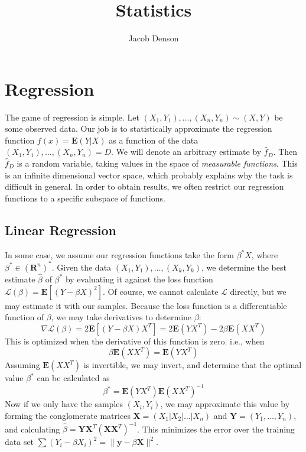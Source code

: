 

\DeclareMathOperator*{\argmin}{arg\,min}

\title{Statistics}
\author{Jacob Denson}



\maketitle
\tableofcontents
{}

\chapter{Regression}

The game of regression is simple. Let $(X_1, Y_1), \dots, (X_n, Y_n) \sim (X,Y)$ be some observed data. Our job is to statistically approximate the regression function $f(x) = \mathbf{E}(Y | X)$ as a function of the data $(X_1, Y_1), \dots, (X_n, Y_n) = D$. We will denote an arbitrary estimate by $\hat{f}_D$. Then $\hat{f}_D$ is a random variable, taking values in the space of {\it measurable functions}. This is an infinite dimensional vector space, which probably explains why the task is difficult in general. In order to obtain results, we often restrict our regression functions to a specific subspace of functions.

\section{Linear Regression}

In some case, we assume our regression functions take the form $\beta^* X$, where $\beta^* \in (\mathbf{R}^n)^*$. Given the data $(X_1, Y_1), \dots, (X_k, Y_k)$, we determine the best estimate $\hat{\beta}$ of $\beta^*$ by evaluating it against the loss function $\mathcal{L}(\beta) = \mathbf{E}[(Y - \beta X)^2]$. Of course, we cannot calculate $\mathcal{L}$ directly, but we may estimate it with our samples. Because the loss function is a differentiable function of $\beta$, we may take derivatives to determine $\beta$:
%
\[ \nabla \mathcal{L} (\beta) = 2 \mathbf{E}[(Y - \beta X)X^T] = 2 \mathbf{E}(YX^T) - 2\beta \mathbf{E}(XX^T) \]
%
This is optimized when the derivative of this function is zero. i.e., when
%
\[ \beta \mathbf{E}(XX^T) = \mathbf{E}(YX^T) \]
%
Assuming $\mathbf{E}(XX^T)$ is invertible, we may invert, and determine that the optimal value $\beta^*$ can be calculated as
%
\[ \beta^* = \mathbf{E}(YX^T) \mathbf{E}(XX^T)^{-1} \]
%
Now if we only have the samples $(X_i, Y_i)$, we may approximate this value by forming the conglomerate matrices $\mathbf{X} = (X_1 | X_2 | \dots | X_n)$ and $\mathbf{Y} = (Y_1, \dots, Y_n)$, and calculating $\hat{\beta} = \mathbf{Y} \mathbf{X}^T (\mathbf{X} \mathbf{X}^T)^{-1}$. This minimizes the error over the training data set $\sum (Y_i - \beta X_i)^2 = \|\mathbf{y} - \beta \mathbf{X}\|^2$.

